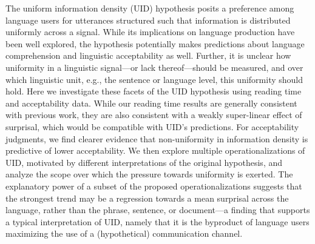 The uniform information density (UID) hypothesis posits a preference among language users for utterances structured such that information is distributed uniformly across a signal. While its implications on language production have been well explored, the hypothesis potentially makes predictions about language comprehension and linguistic acceptability as well. Further, it is unclear how uniformity in a linguistic signal---or lack thereof---should be measured, and over which linguistic unit, e.g., the sentence or language level, this uniformity should hold. Here we investigate these facets of the UID hypothesis using reading time and acceptability data. While our reading time results are generally consistent with previous work, they are also consistent with a weakly super-linear effect of surprisal, which would be compatible with UID's predictions. For acceptability judgments, we find clearer evidence that non-uniformity in information density is predictive of lower acceptability. We then explore multiple operationalizations of UID, motivated by different interpretations of the original hypothesis, and analyze the scope over which the pressure towards uniformity is exerted. The explanatory power of a subset of the proposed operationalizations suggests that the strongest trend may be a regression towards a mean surprisal across the language, rather than the phrase, sentence, or document---a finding that supports a typical interpretation of UID, namely that it is the byproduct of language users maximizing the use of a (hypothetical) communication channel.
